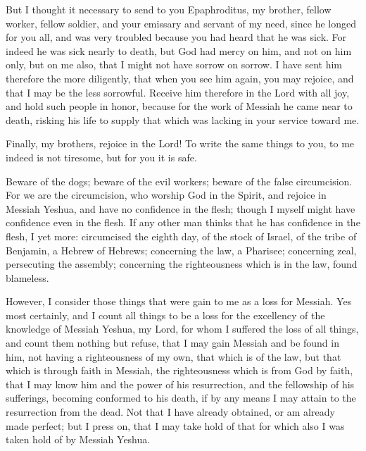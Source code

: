 \myverse{}But I thought it necessary to send to you Epaphroditus, my brother,
fellow worker, fellow soldier, and your emissary and servant of my need,
\myverse{}since he longed for you all, and was very troubled because you had heard that
he was sick.
\myverse{}For indeed he was sick nearly to death, but God had mercy on him, and not
on him only, but on me also, that I might not have sorrow on sorrow.
\myverse{}I have sent him therefore the more diligently, that when you see him again,
you may rejoice, and that I may be the less sorrowful.
\myverse{}Receive him therefore in the Lord with all joy, and hold such people in honor,
\myverse{}because for the work of Messiah he came near to death, risking his life to
supply that which was lacking in your service toward me.


\mychapter{} \myverse*{}Finally, my brothers, rejoice in the Lord! To write the same things
to you, to me indeed is not tiresome, but for you it is safe.

\myverse{}Beware of the dogs; beware of the evil workers; beware of the false
circumcision.
\myverse{}For we are the circumcision, who worship God in the Spirit, and rejoice in Messiah
Yeshua, and have no confidence in the flesh;
\myverse{}though I myself might have confidence even in the flesh. If any other man thinks
that he has confidence in the flesh, I yet more:
\myverse{}circumcised the eighth day, of the stock of Israel, of the tribe of Benjamin,
a Hebrew of Hebrews; concerning the law, a Pharisee;
\myverse{}concerning zeal, persecuting the assembly; concerning the righteousness which
is in the law, found blameless.

\myverse{}However, I consider those things that were gain to me as a loss
for Messiah.
\myverse{}Yes most certainly, and I count all things to be a loss for the excellency of
the knowledge of Messiah Yeshua, my Lord, for whom I suffered the loss of all things, and count them nothing
but refuse, that I may gain Messiah
\myverse{}and be found in him, not having a righteousness of my own, that which is of
the law, but that which is through faith in Messiah, the righteousness which is from God by faith,
\myverse{}that I may know him and the power of his resurrection, and the fellowship
of his sufferings, becoming conformed to his death,
\myverse{}if by any means I may attain to the resurrection from the dead.
\myverse{}Not that I have already obtained, or am already made perfect; but I press
on, that I may take hold of that for which also I was taken hold of by Messiah Yeshua.

